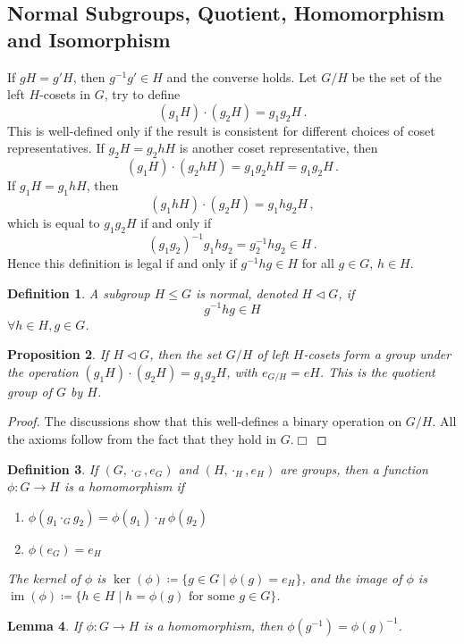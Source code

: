 \documentclass{article}
\theoremstyle{plain}\theoremheaderfont{\normalfont\itshape}\theorembodyfont{\rmfamily}\theoremseparator{.}\newtheorem*{rem}{Remark}\newtheorem*{ex}{Example}\newtheorem*{proof}{Proof}\newtheorem*{altp}{Alternative proof}\newtheorem*{nonex}{Non-Example}
\theoremstyle{plain}\theoremheaderfont{\normalfont\bfseries}\theorembodyfont{\rmfamily}\theoremseparator{.}\newtheorem{thm}{Theorem}[section]\newtheorem{lem}[thm]{Lemma}\newtheorem{prop}[thm]{Proposition}\newtheorem*{cor}{Corollary}\newtheorem{defn}[thm]{Definition}\newtheorem{clm}[thm]{Claim}\newtheorem{clminproof}{Claim}\newtheorem*{notn}{Notation}\newtheorem*{exer}{Exercise}\newtheorem*{lemnn}{Lemma}
\theoremstyle{break}\theoremheaderfont{\normalfont\itshape}\theorembodyfont{\rmfamily}\theoremseparator{.\medskip}\newtheorem*{proofskip}{Proof}\newtheorem*{exs}{Examples}\newtheorem*{rems}{Remarks}\newtheorem*{obs}{Observations}
\theoremstyle{break}\theoremheaderfont{\normalfont\bfseries}\theorembodyfont{\rmfamily}\theoremseparator{.\medskip}\newtheorem{lemskip}[thm]{Lemma}\newtheorem{defnskip}[thm]{Definition}\newtheorem{propskip}[thm]{Proposition}\newtheorem{thmskip}[thm]{Theorem}
\numberwithin{equation}{section}
\newcommand{\qed}{\hfill\ensuremath{\Box}}
\DeclareMathOperator*{\im}{im}
\begin{document}
    \subsection{Normal Subgroups, Quotient, Homomorphism and Isomorphism}
    If \(gH=g'H\), then \(g^{-1}g'\in H\) and the converse holds. Let \(G/H\) be the set of the left \(H\)-cosets in \(G\), try to define
    \[(g_1H)\cdot(g_2H)=g_1g_2 H\,.\]
    This is well-defined only if the result is consistent for different choices of coset representatives. If \(g_2H=g_2hH\) is another coset representative, then
    \[(g_1H)\cdot(g_2hH)=g_1g_2hH=g_1g_2H\,.\]
    If \(g_1H=g_1hH\), then
    \[(g_1hH)\cdot(g_2H)=g_1hg_2H\,,\]
    which is equal to \(g_1g_2H\) if and only if
    \[(g_1g_2)^{-1}g_1hg_2=g_2^{-1}hg_2\in H\,.\]
    Hence this definition is legal if and only if \(g^{-1}hg\in H\) for all \(g\in G\), \(h\in H\).
    \begin{defn}
        A subgroup \(H\le G\) is \textit{normal}, denoted \(H\lhd G\), if
        \[g^{-1}hg\in H\]
        \(\forall h\in H, g\in G\).
    \end{defn}
    \begin{prop}
        If \(H\lhd G\), then the set \(G/H\) of left \(H\)-cosets form a group under the operation \((g_1H)\cdot(g_2H)=g_1g_2H\), with \(e_{G/H}=eH\). This is the \textit{quotient group} of \(G\) by \(H\).
    \end{prop}
    \begin{proof}
        The discussions show that this well-defines a binary operation on \(G/H\). All the axioms follow from the fact that they hold in \(G\).\qed
    \end{proof}
    \begin{defn}
        If \((G,\cdot_{G},e_G)\) and \((H,\cdot_{H},e_H)\) are groups, then a function \(\phi:G\to H\) is a \textit{homomorphism} if
        \begin{enumerate}[topsep=0pt,label=(\roman*)]
            \item \(\phi(g_1\cdot_G g_2)=\phi(g_1)\cdot_H \phi(g_2)\)
            \item \(\phi(e_G)=e_H\)
        \end{enumerate}
        The \textit{kernel} of \(\phi\) is \(\ker(\phi)\coloneqq\{g\in G\mid\phi(g)=e_H\}\), and the \textit{image} of \(\phi\) is \(\im(\phi)\coloneqq\{h\in H\mid h=\phi(g)\text{ for some }g\in G\}\).
    \end{defn}
    \begin{lem}
        If \(\phi:G\to H\) is a homomorphism, then \(\phi(g^{-1})=\phi(g)^{-1}\).
    \end{lem}
\end{document}
